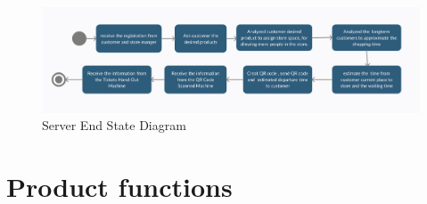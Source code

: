\documentclass[a4paper,12pt]{report}
\begin{document}
\begin{figure}[H] 
	\includegraphics[scale=0.3]{State_diagram3.png}
	\caption{Server End State Diagram}
	\centering
	\label{State Diagram 3}
\end{figure}

\newpage

\section{Product functions}
\end{document}
